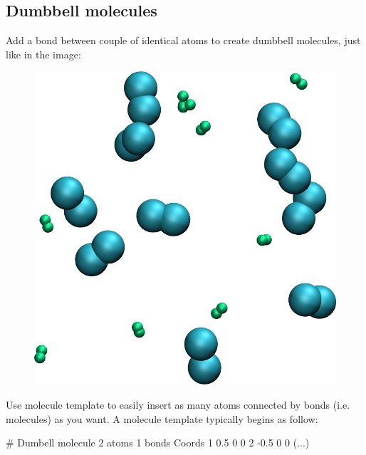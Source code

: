 \noindent \subsection{Dumbbell molecules}

Add a bond between couple of identical atoms to create
dumbbell molecules, just like in the image:

\begin{figure}
\includegraphics[width=\linewidth]{tutorials/level0/lennard-jones-fluid/dumbell-light.png}
\end{figure}

\begin{tcolorbox}[colback=mylightblue!5!white,colframe=mylightblue!75!black,title=Hints]
Use molecule template to easily insert as many atoms connected
by bonds (i.e. molecules) as you want. A molecule 
template typically begins as follow:
\begin{lcverbatim}
# Dumbell molecule
2 atoms
1 bonds
Coords
1 0.5 0 0
2 -0.5 0 0
(...)
\end{lcverbatim}

\noindent \end{tcolorbox}

